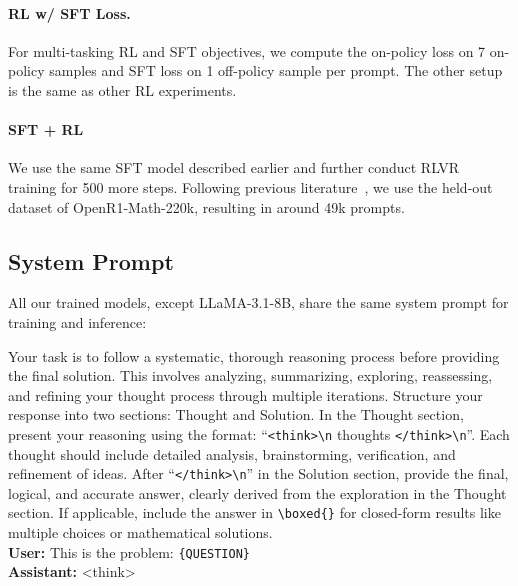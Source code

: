 \paragraph{RL w/ SFT Loss.} For multi-tasking RL and SFT objectives, we compute the on-policy loss on 7 on-policy samples and SFT loss on 1 off-policy sample per prompt. The other setup is the same as other RL experiments. 

\paragraph{SFT + RL} We use the same SFT model described earlier and further conduct RLVR training for 500 more steps. Following previous literature~\cite{prime}, we use the held-out dataset of OpenR1-Math-220k, resulting in around 49k prompts. 



\subsection{System Prompt}\label{app:system}
All our trained models, except LLaMA-3.1-8B, share the same system prompt for training and inference: 
\begin{tcolorbox}[
    center,
    arc=0mm,
    boxrule=1pt,
    colback=blue!6!white,
    colframe=black,
    colbacktitle=black,
    attach boxed title to top left={yshift=-0.1in,xshift=0.15in},
    boxed title style={boxrule=0pt,colframe=white}
]
Your task is to follow a systematic, thorough reasoning process before providing the final solution. This involves analyzing, summarizing, exploring, reassessing, and refining your thought process through multiple iterations. Structure your response into two sections: Thought and Solution. In the Thought section, present your reasoning using the format: “\verb|<think>\n| {thoughts} \verb|</think>\n|”. Each thought should include detailed analysis, brainstorming, verification, and refinement of ideas. After “\verb|</think>\n|” in the Solution section, provide the final, logical, and accurate answer, clearly derived from the exploration in the Thought section. If applicable, include the answer in \verb|\boxed{}| for closed-form results like multiple choices or mathematical solutions. \\
\textbf{User:} This is the problem: \verb|{QUESTION}| \\
\textbf{Assistant:} <think>
\end{tcolorbox}

